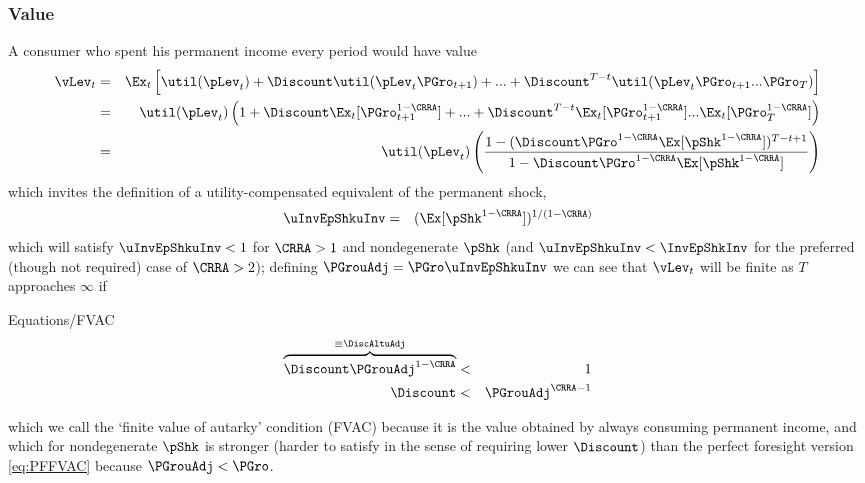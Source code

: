 \documentclass[titlepage]{\econtex}\providecommand{\texname}{BufferStockTheory}%
\providecommand{\EqDir}{Equations}
\begin{document}
\subsubsection{Value}
A consumer who spent his permanent income every period would have
value
\begin{eqnarray*}
      \vLev_{t} & = & \Ex_{t}\left[\util(\pLev_{t}) + \Discount \util(\pLev_{t}\PGro_{t+1}) + ... + \Discount^{T-t}\util(\pLev_{t}\PGro_{t+1}...\PGro_{T})\right] \\
%
      & = & \util(\pLev_{t})\left(1+ \Discount \Ex_{t}[\PGro_{t+1}^{1-\CRRA}] +  ... + \Discount^{T-t}\Ex_{t}[\PGro_{t+1}^{1-\CRRA}]...\Ex_{t}[\PGro_{T}^{1-\CRRA}]\right) \\
%
      & = & \util(\pLev_{t})\left(\frac{1-(\Discount \PGro^{1-\CRRA}\Ex[\pShk^{1-\CRRA}])^{T-t+1}}{1-\Discount \PGro^{1-\CRRA} \Ex[\pShk^{1-\CRRA}]}\right)
      \end{eqnarray*}
which invites the definition of a utility-compensated equivalent of the permanent shock,
\begin{eqnarray*}
  \uInvEpShkuInv & = & (\Ex[\pShk^{1-\CRRA}])^{1/(1-\CRRA)}
\end{eqnarray*}
which will satisfy $\uInvEpShkuInv < 1$ for $\CRRA>1$ and nondegenerate $\pShk$ (and $\uInvEpShkuInv < \InvEpShkInv$ for the preferred (though not required) case of $\CRRA > 2$); defining $\PGrouAdj=\PGro \uInvEpShkuInv$ we can see that $\vLev_{t}$ will be finite as $T$ approaches $\infty$ if

\begin{verbatimwrite}{\EqDir/FVAC}
\begin{eqnarray}
\overbrace{\Discount \PGrouAdj^{1-\CRRA} }^{\equiv \DiscAltuAdj} & < & 1 \label{eq:FVAC}
\\ \Discount & < & \PGrouAdj^{\CRRA-1} \notag
\end{eqnarray}
\end{verbatimwrite}
 which we call the `finite value of autarky'
condition (FVAC) because it is the value obtained by always consuming
permanent income, and which for nondegenerate $\pShk$ is stronger
(harder to satisfy in the sense of requiring lower $\Discount$) than
the perfect foresight version \eqref{eq:PFFVAC} because $\PGrouAdj <
\PGro$.
\begin{comment}
A useful alternative version is
\begin{verbatimwrite}{\EqDir/FVACAlt}
\begin{eqnarray}
    \Discount \Rfree \PGro^{-\CRRA} \uInvEpShkuInv^{1-\CRRA}  & < & \Rfree/\PGro \nonumber
%
\\ \PatPGro \uInvEpShkuInv^{1/\CRRA-1} & < & (\Rfree/\PGro)^{1/\CRRA} \label{eq:FVACAlt}.
\end{eqnarray}
\end{verbatimwrite}

\end{comment}
\end{document}
